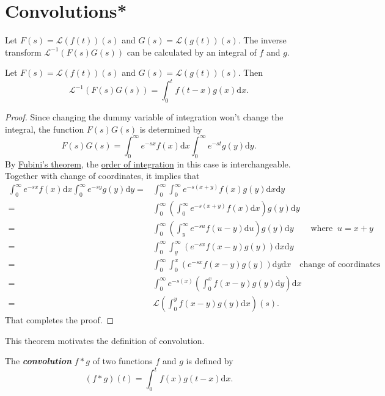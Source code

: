 \section{Convolutions*}

Let $F(s)=\mathcal{L}(f(t))(s)$ and $G(s)=\mathcal{L}(g(t))(s)$. The inverse transform $\mathcal{L}^{-1}(F(s)G(s))$ can be calculated by an integral of $f$ and $g$.

\begin{theorem}
  Let $F(s)=\mathcal{L}(f(t))(s)$ and $G(s)=\mathcal{L}(g(t))(s)$. Then
  \[\mathcal{L}^{-1}(F(s)G(s))=\int_0^t f(t-x)g(x)\mathrm{d} x.\] 
\end{theorem}
\begin{proof}
Since changing the dummy variable of integration won't change the integral, the function $F(s)G(s)$ is determined by
\[F(s)G(s)=\int_0^\infty e^{-sx}f(x)\mathrm{d} x\int_0^\infty e^{-st}g(y)\mathrm{d} y.\]
By \href{https://en.wikipedia.org/wiki/Fubini\%27s_theorem}{Fubini's theorem}, the \href{https://en.wikipedia.org/wiki/Order_of_integration_(calculus)}{order of integration} in this case is interchangeable. Together with change of coordinates, it implies that 
\[
  \begin{aligned}
    \int_0^\infty e^{-sx}f(x)\mathrm{d} x\int_0^\infty e^{-sy}g(y)\mathrm{d} y
    =&\int_0^\infty \int_0^\infty e^{-s(x+y)}f(x)g(y)\mathrm{d} x\mathrm{d} y\\
    =&\int_0^\infty \left(\int_0^\infty e^{-s(x+y)}f(x)\mathrm{d} x\right) g(y)\mathrm{d} y\\
    =&\int_0^\infty \left(\int_y^\infty e^{-su}f(u-y)\mathrm{d} u\right) g(y)\mathrm{d} y\qquad \text{where }~ u=x+y \\
    =&\int_0^\infty\int_y^\infty\left(e^{-sx}f(x-y)g(y)\right)\mathrm{d} x \mathrm{d} y\\
    =&\int_0^\infty\int_0^x\left(e^{-sx}f(x-y)g(y)\right)\mathrm{d} y \mathrm{d} x \quad \text{change of coordinates}\\
    =&\int_0^\infty e^{-s(x)}\left(\int_0^x f(x-y)g(y)\mathrm{d} y\right)\mathrm{d} x \\
    =&\mathcal{L}\left(\int_0^y f(x-y)g(y)\mathrm{d} x\right)(s).
  \end{aligned}
  \]
  That completes the proof.
\end{proof}

This theorem motivates the definition of convolution.

\begin{definition}
  The \emph{\textbf{convolution}} $f*g$ of two functions $f$ and $g$ is defined by
\[(f*g)(t)=\int_0^t f(x)g(t-x)\mathrm{d} x.\]
\end{definition}

